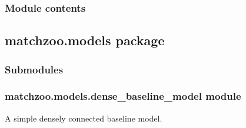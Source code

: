 \documentclass[letterpaper,10pt,english]{sphinxmanual}
\begin{document}
\subsubsection{Module contents}
\label{\detokenize{matchzoo.engine:module-matchzoo.engine}}\label{\detokenize{matchzoo.engine:module-contents}}

\subsection{matchzoo.models package}
\label{\detokenize{matchzoo.models::doc}}\label{\detokenize{matchzoo.models:matchzoo-models-package}}

\subsubsection{Submodules}
\label{\detokenize{matchzoo.models:submodules}}

\subsubsection{matchzoo.models.dense\_baseline\_model module}
\label{\detokenize{matchzoo.models:module-matchzoo.models.dense_baseline_model}}\label{\detokenize{matchzoo.models:matchzoo-models-dense-baseline-model-module}}
A simple densely connected baseline model.
\end{document}

